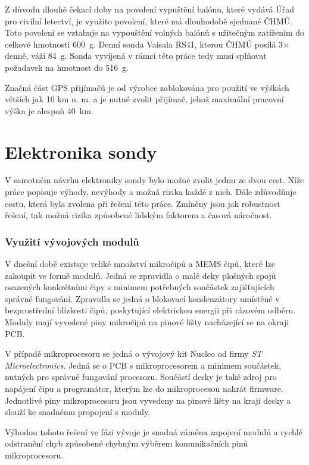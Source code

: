 \documentclass[twoside]{ctuthesis}
\theoremstyle{plain}
\theoremstyle{definition}
\theoremstyle{note}
\begin{document}
	Z důvodu dlouhé čekací doby na povolení vypuštění balónu, které vydává Úřad pro civilní letectví, je využito povolení, které má dlouhodobě sjednané ČHMÚ. Toto povolení se vztahuje na vypouštění volných balónů s užitečným zatížením do celkové hmotnosti 600~g. Denní sonda Vaisala RS41, kterou ČHMÚ posílá 3$\times$ denně, váží 84~g. Sonda vyvíjená v rámci této práce tedy musí splňovat požadavek na hmotnost do 516~g.

	Značná část GPS přijímačů je od výrobce zablokována pro použití ve výškách větších jak 10 km n. m. a je nutné zvolit přijímač, jehož maximální pracovní výška je alespoň 40~km.


	
	\section{Elektronika sondy}

	V samotném návrhu elektroniky sondy bylo možné zvolit jednu ze dvou cest. Níže práce popisuje výhody, nevýhody a možná rizika každé z nich. Dále zdůvodňuje cestu, která byla zvolena při řešení této práce. Zmíněny jsou jak robustnost řešení, tak možná rizika způsobené lidským faktorem a časová náročnost.

	\subsubsection{Využití vývojových modulů}
	V dnešní době existuje veliké množství mikročipů a MEMS čipů, které lze zakoupit ve formě modulů. Jedná se zpravidla o malé deky plošných spojů osazených konkrétními čipy s minimem potřebných součástek zajišťujících správné fungování. Zpravidla se jedná o blokovací kondenzátory umístěné v bezprostřední blízkosti čipů, poskytující elektrickou energii při rázovém odběru. Moduly mají vyvedené piny mikročipů na pinové lišty nacházející se na okraji PCB. 

	V případě mikroprocesoru se jedná o vývojový kit Nucleo od firmy \textit{ST Microelectronics}. Jedná se o PCB s mikroprocesorem a minimem součástek, nutných pro správné fungování procesoru. Součástí desky je také zdroj pro napájení čipu a programátor, kterým lze do mikroprocesou nahrát firmware. Jednotlivé piny mikroprocesoru jsou vyvedeny na pinové lišty na kraji desky a slouží ke snadnému propojení s moduly. 

	Výhodou tohoto řešení ve fázi vývoje je snadná záměna zapojení modulů a rychlé odstranění chyb způsobené chybným výběrem komunikačních pinů mikroprocesoru.
\end{document}
